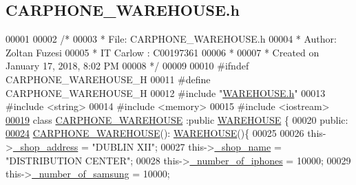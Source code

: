 \hypertarget{_c_a_r_p_h_o_n_e___w_a_r_e_h_o_u_s_e_8h_source}{}\subsection{C\+A\+R\+P\+H\+O\+N\+E\+\_\+\+W\+A\+R\+E\+H\+O\+U\+S\+E.\+h}

\begin{DoxyCode}
00001 
00002 \textcolor{comment}{/* }
00003 \textcolor{comment}{ * File:   CARPHONE\_WAREHOUSE.h}
00004 \textcolor{comment}{ * Author: Zoltan Fuzesi}
00005 \textcolor{comment}{ * IT Carlow : C00197361}
00006 \textcolor{comment}{ *}
00007 \textcolor{comment}{ * Created on January 17, 2018, 8:02 PM}
00008 \textcolor{comment}{ */}
00009 
00010 \textcolor{preprocessor}{#ifndef CARPHONE\_WAREHOUSE\_H}
00011 \textcolor{preprocessor}{#define CARPHONE\_WAREHOUSE\_H}
00012 \textcolor{preprocessor}{#include "\hyperlink{_w_a_r_e_h_o_u_s_e_8h}{WAREHOUSE.h}"}
00013 \textcolor{preprocessor}{#include <string>}
00014 \textcolor{preprocessor}{#include <memory>}
00015 \textcolor{preprocessor}{#include <iostream>}
\hypertarget{_c_a_r_p_h_o_n_e___w_a_r_e_h_o_u_s_e_8h_source.tex_l00019}{}\hyperlink{class_c_a_r_p_h_o_n_e___w_a_r_e_h_o_u_s_e}{00019} \textcolor{keyword}{class }\hyperlink{class_c_a_r_p_h_o_n_e___w_a_r_e_h_o_u_s_e}{CARPHONE\_WAREHOUSE} :\textcolor{keyword}{public} \hyperlink{class_w_a_r_e_h_o_u_s_e}{WAREHOUSE} \{
00020 \textcolor{keyword}{public}:
\hypertarget{_c_a_r_p_h_o_n_e___w_a_r_e_h_o_u_s_e_8h_source.tex_l00024}{}\hyperlink{class_c_a_r_p_h_o_n_e___w_a_r_e_h_o_u_s_e_a0acec1e20e236b4debf1e0d26334a868_a0acec1e20e236b4debf1e0d26334a868}{00024}     \hyperlink{class_c_a_r_p_h_o_n_e___w_a_r_e_h_o_u_s_e_a0acec1e20e236b4debf1e0d26334a868_a0acec1e20e236b4debf1e0d26334a868}{CARPHONE\_WAREHOUSE}(): \hyperlink{class_w_a_r_e_h_o_u_s_e}{WAREHOUSE}()\{
00025         
00026         this->\hyperlink{class_c_a_r_p_h_o_n_e___w_a_r_e_h_o_u_s_e_a085b59da7d9f351043de6398b98898a7_a085b59da7d9f351043de6398b98898a7}{\_shop\_address} = \textcolor{stringliteral}{"DUBLIN XII"};
00027         this->\hyperlink{class_c_a_r_p_h_o_n_e___w_a_r_e_h_o_u_s_e_a4ac330ca32a05ae4391a00db62ca6128_a4ac330ca32a05ae4391a00db62ca6128}{\_shop\_name} = \textcolor{stringliteral}{"DISTRIBUTION CENTER"};
00028         this->\hyperlink{class_c_a_r_p_h_o_n_e___w_a_r_e_h_o_u_s_e_af8f016cde9df0070da24fb8804f3d6ca_af8f016cde9df0070da24fb8804f3d6ca}{\_number\_of\_iphones} = 10000;
00029         this->\hyperlink{class_c_a_r_p_h_o_n_e___w_a_r_e_h_o_u_s_e_a6ee4003dc7303c7df17f67a26556bdf0_a6ee4003dc7303c7df17f67a26556bdf0}{\_number\_of\_samsung} = 10000;

\end{DoxyCode}
